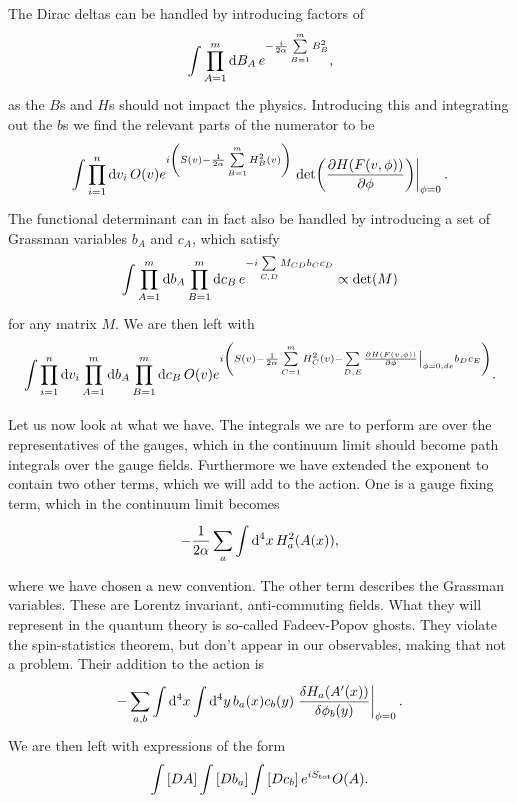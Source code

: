 The Dirac deltas can be handled by introducing factors of
\begin{align*}
\int\limits_{}^{}\prod\limits_{A = 1}^{m}\dd{B_{A}}e^{-\frac{i}{2\alpha}\sum\limits_{B = 1}^{m}B_{B}^{2}},
\end{align*}
as the $B$s and $H$s should not impact the physics. Introducing this and integrating out the $b$s we find the relevant parts of the numerator to be
\begin{align*}
\inte{}{}\prod\limits_{i = 1}^{n}\dd{v_{i}}O(v)e^{i\left(S(v) - \frac{1}{2\alpha}\sum\limits_{B = 1}^{m}H_{B}^{2}(v)\right)}\eval{\det(\pdv{H(F(v, \phi))}{\phi})}_{\phi = 0}.
\end{align*}
The functional determinant can in fact also be handled by introducing a set of Grassman variables $b_{A}$ and $c_{A}$, which satisfy
\begin{align*}
\int\limits_{}^{}\prod\limits_{A = 1}^{m}\dd{b_{A}}\prod\limits_{B = 1}^{m}\dd{c_{B}}e^{-i\sum\limits_{C, D} M_{CD}b_{C}c_{D}} \propto \det(M)
\end{align*}
for any matrix $M$. We are then left with
\begin{align*}
\inte{}{}\prod\limits_{i = 1}^{n}\dd{v_{i}}\prod\limits_{A = 1}^{m}\dd{b_{A}}\prod\limits_{B = 1}^{m}\dd{c_{B}}O(v)e^{i\left(S(v) - \frac{1}{2\alpha}\sum\limits_{C = 1}^{m}H_{C}^{2}(v) - \sum\limits_{D, E} \eval{\pdv{H(F(v, \phi))}{\phi}}_{\phi = 0, de}b_{D}c_{E}\right)}.
\end{align*}

Let us now look at what we have. The integrals we are to perform are over the representatives of the gauges, which in the continuum limit should become path integrals over the gauge fields. Furthermore we have extended the exponent to contain two other terms, which we will add to the action. One is a gauge fixing term, which in the continuum limit becomes
\begin{align*}
	-\frac{1}{2\alpha}\sum\limits_{a}\int\limits_{}^{}\dd[4]{x}H_{a}^{2}(A(x)),
\end{align*}
where we have chosen a new convention. The other term describes the Grassman variables. These are Lorentz invariant, anti-commuting fields. What they will represent in the quantum theory is so-called Fadeev-Popov ghosts. They violate the spin-statistics theorem, but don't appear in our observables, making that not a problem. Their addition to the action is
\begin{align*}
	-\sum\limits_{a, b}\integ[4]{}{}{x}{\integ[4]{}{}{y}{b_{a}(x)c_{b}(y)\eval{\fdv{H_{a}(A\p(x))}{\phi_{b}(y)}}_{\phi = 0}}}.
\end{align*}
We are then left with expressions of the form
\begin{align*}
	\int\limits_{}\left[DA\right]\int\limits_{}\left[Db_{a}\right]\int\limits_{}\left[Dc_{b}\right]e^{iS_{\text{tot}}}O(A).
\end{align*}

